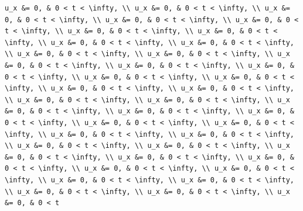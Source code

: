 \documentclass[
  ukrainian,
]{article}
\begin{document}
\begin{verbatim}
u_x &= 0, & 0 < t < \infty, \\ u_x &= 0, & 0 < t < \infty, \\ u_x &= 0, & 0 < t < \infty, \\ u_x &= 0, & 0 < t < \infty, \\ u_x &= 0, & 0 < t < \infty, \\ u_x &= 0, & 0 < t < \infty, \\ u_x &= 0, & 0 < t < \infty, \\ u_x &= 0, & 0 < t < \infty, \\ u_x &= 0, & 0 < t < \infty, \\ u_x &= 0, & 0 < t < \infty, \\ u_x &= 0, & 0 < t < \infty, \\ u_x &= 0, & 0 < t < \infty, \\ u_x &= 0, & 0 < t < \infty, \\ u_x &= 0, & 0 < t < \infty, \\ u_x &= 0, & 0 < t < \infty, \\ u_x &= 0, & 0 < t < \infty, \\ u_x &= 0, & 0 < t < \infty, \\ u_x &= 0, & 0 < t < \infty, \\ u_x &= 0, & 0 < t < \infty, \\ u_x &= 0, & 0 < t < \infty, \\ u_x &= 0, & 0 < t < \infty, \\ u_x &= 0, & 0 < t < \infty, \\ u_x &= 0, & 0 < t < \infty, \\ u_x &= 0, & 0 < t < \infty, \\ u_x &= 0, & 0 < t < \infty, \\ u_x &= 0, & 0 < t < \infty, \\ u_x &= 0, & 0 < t < \infty, \\ u_x &= 0, & 0 < t < \infty, \\ u_x &= 0, & 0 < t < \infty, \\ u_x &= 0, & 0 < t < \infty, \\ u_x &= 0, & 0 < t < \infty, \\ u_x &= 0, & 0 < t < \infty, \\ u_x &= 0, & 0 < t < \infty, \\ u_x &= 0, & 0 < t < \infty, \\ u_x &= 0, & 0 < t < \infty, \\ u_x &= 0, & 0 < t < \infty, \\ u_x &= 0, & 0 < t < \infty, \\ u_x &= 0, & 0 < t < \infty, \\ u_x &= 0, & 0 < t
\end{verbatim}
\end{document}
